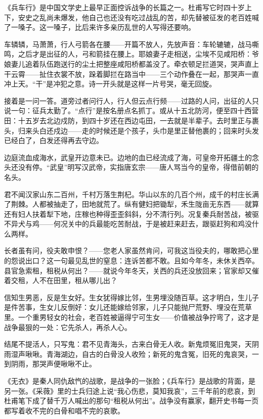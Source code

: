 \begin{appreciation}
《兵车行》是中国文学史上最早正面控诉战争的长篇之一。杜甫写它时四十岁上下，安史之乱尚未爆发，他自己也还没有吃过战乱的苦，却先替被征发的老百姓喊了一嗓子。这一嗓子，比后来许多亲历乱世的人写得还要响。

车辚辚，马萧萧，行人弓箭各在腰——开篇不放人，先放声音：车轮辘辘，战马嘶鸣，之后才是出征的人，弓和箭挂在腰上。耶娘妻子走相送，尘埃不见咸阳桥：爷娘妻儿追着队伍跑送行的尘土把整座咸阳桥都盖没了。牵衣顿足拦道哭，哭声直上干云霄——扯住衣裳不放，跺着脚拦在路当中——三个动作叠在一起，那哭声一直冲上天。“干”是冲犯之意。诗一开头就是这样一片号哭，毫无回旋。

接着是一问一答。道旁过者问行人，行人但云点行频——过路的人问，出征的人只说一句：征兵太勤了。“点行”是按名册点名抓丁。或从十五北防河，便至四十西营田：十五岁去北边戍防，到四十岁还在西边屯田，一去就是半辈子。去时里正与裹头，归来头白还戍边——走的时候还是个孩子，头巾是里正替他裹的；回来时头发已经白了，白发还得再去守边。

边庭流血成海水，武皇开边意未已。边地的血已经流成了海，可皇帝开拓疆土的念头还没有停。“武皇”明写汉武帝，实指唐玄宗——唐人骂当今的皇帝，得借前朝的名头。

君不闻汉家山东二百州，千村万落生荆杞。华山以东的几百个州，成千的村庄长满了荆棘。人都被抽走了，田地就荒了。纵有健妇把锄犁，禾生陇亩无东西——就算还有妇人扶着犁下地，庄稼也种得歪歪斜斜，分不清行列。况复秦兵耐苦战，被驱不异犬与鸡——何况关中的兵最能吃苦耐战，于是被赶来赶去，跟驱赶狗和鸡没什么两样。

长者虽有问，役夫敢申恨？——您老人家虽然肯问，可我这当役夫的，哪敢把心里的怨说出口？这一句最见乱世的窒息：连诉苦都不敢。且如今年冬，未休关西卒。县官急索租，租税从何出？——就说今年冬天，关西的兵还没放回来；官家却又催着交租，人不在田里，租从哪儿出？

信知生男恶，反是生女好。生女犹得嫁比邻，生男埋没随百草。这才明白，生儿子是件苦事，生女儿反倒好：女儿还能嫁给邻家，儿子只能抛尸荒野、埋没在荒草里。一个重男轻女的社会，老百姓被逼得宁可生女——价值被战争拧弯了，这才是战争最狠的一处：它先杀人，再杀人心。

结尾不提活人，只写鬼：君不见青海头，古来白骨无人收。新鬼烦冤旧鬼哭，天阴雨湿声啾啾。青海湖边，自古的白骨没人收殓；新死的鬼含冤，旧死的鬼哀哭，一到阴雨，那哭声便啾啾不止。

《无衣》是秦人同仇敌忾的战歌，是战争的一张脸；《兵车行》是战歌的背面，是另一张。《采薇》里的士兵归途上说“我心伤悲，莫知我哀”，三千年前的悲哀，到杜甫笔下成了替千万人喊出的那句“租税从何出”。战争没有赢家，翻开史书每一页都写着收不完的白骨和唱不完的哀歌。
\end{appreciation}
